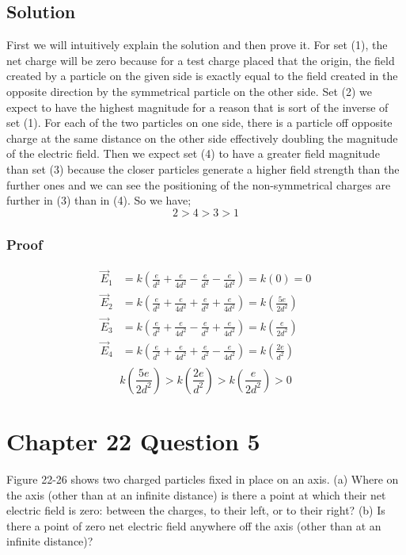 \documentclass{article}
\begin{document}
\subsection*{Solution}
First we will intuitively explain the solution and then prove it. 
For set (1), the net charge will be zero because for a test charge placed that the origin, the field created by a particle on the given side is exactly equal to the field created in the opposite direction by the symmetrical particle on the other side.
Set (2) we expect to have the highest magnitude for a reason that is sort of the inverse of set (1). For each of the two particles on one side, there is a particle off opposite charge at the same distance on the other side effectively doubling the magnitude of the electric field.
Then we expect set (4) to have a greater field magnitude than set (3) because the closer particles generate a higher field strength than the further ones and we can see the positioning of the non-symmetrical charges are further in (3) than in (4).
So we have;
\[
	\boxed{2 > 4 > 3 > 1}
\]

\subsubsection*{Proof}
\begin{align*}
	\vec{E}_1 &= k\left( \frac{e}{d^2} + \frac{e}{4d^2} - \frac{e}{d^2} - \frac{e}{4d^2} \right) = k (0) = 0 \\
	\vec{E}_2 &= k\left( \frac{e}{d^2} + \frac{e}{4d^2} + \frac{e}{d^2} + \frac{e}{4d^2} \right) = k \left( \frac{5e}{2d^2} \right) \\
	\vec{E}_3 &= k\left( \frac{e}{d^2} + \frac{e}{4d^2} - \frac{e}{d^2} + \frac{e}{4d^2} \right) = k \left( \frac{e}{2d^2} \right) \\
	\vec{E}_4 &= k\left( \frac{e}{d^2} + \frac{e}{4d^2} + \frac{e}{d^2} - \frac{e}{4d^2} \right) = k \left( \frac{2e}{d^2} \right) \\
\end{align*}
\[
	k \left( \frac{5e}{2d^2} \right) > k \left( \frac{2e}{d^2} \right) > k \left( \frac{e}{2d^2} \right) > 0	
\]

\section*{Chapter 22 Question 5}
Figure 22-26 shows two charged particles fixed in place on an axis. (a) Where on the axis (other than at an infinite distance) is there a point at which their net electric field is zero: between the charges, to their left, or to their right? 
(b) Is there a point of zero net electric field anywhere off the axis (other than at an infinite distance)?
\end{document}
